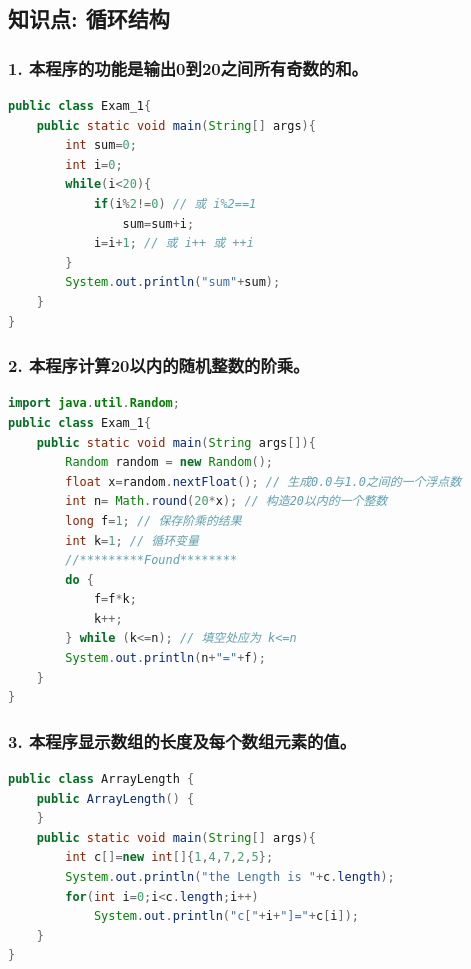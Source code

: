 \documentclass[a4paper,12pt]{article}
\begin{document}
\subsection{知识点: 循环结构}

\subsubsection{1. 本程序的功能是输出0到20之间所有奇数的和。}

\begin{lstlisting}[language=Java, caption=输出0到20之间所有奇数的和]
public class Exam_1{
    public static void main(String[] args){
        int sum=0;
        int i=0;
        while(i<20){
            if(i%2!=0) // 或 i%2==1
                sum=sum+i;
            i=i+1; // 或 i++ 或 ++i
        }
        System.out.println("sum"+sum);
    }
}
\end{lstlisting}

\subsubsection{2. 本程序计算20以内的随机整数的阶乘。}

\begin{lstlisting}[language=Java, caption=计算20以内的随机整数的阶乘]
import java.util.Random;
public class Exam_1{
    public static void main(String args[]){
        Random random = new Random();
        float x=random.nextFloat(); // 生成0.0与1.0之间的一个浮点数
        int n= Math.round(20*x); // 构造20以内的一个整数
        long f=1; // 保存阶乘的结果
        int k=1; // 循环变量
        //*********Found********
        do {
            f=f*k;
            k++;
        } while (k<=n); // 填空处应为 k<=n
        System.out.println(n+"="+f);
    }
}
\end{lstlisting}

\subsubsection{3. 本程序显示数组的长度及每个数组元素的值。}

\begin{lstlisting}[language=Java, caption=显示数组的长度及每个数组元素的值]
public class ArrayLength {
    public ArrayLength() {
    }
    public static void main(String[] args){
        int c[]=new int[]{1,4,7,2,5};
        System.out.println("the Length is "+c.length);
        for(int i=0;i<c.length;i++)
            System.out.println("c["+i+"]="+c[i]);
    }
}
\end{lstlisting}
\end{document}
